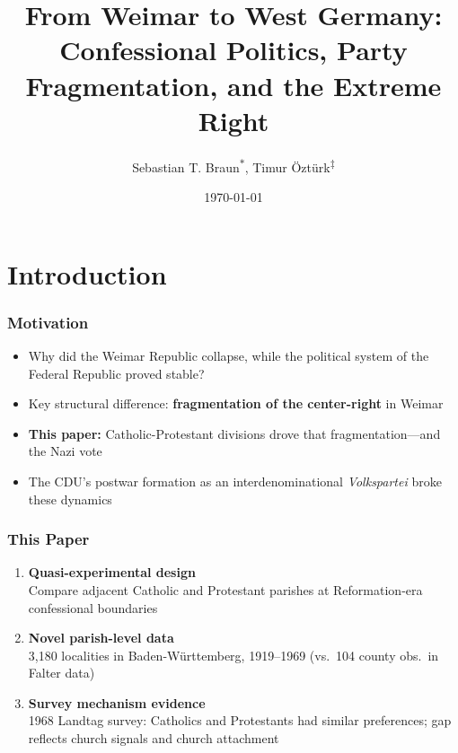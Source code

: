 \documentclass[10pt]{beamer}
\author[Braun and \"{O}zt\"{u}rk]{Sebastian T. Braun\textsuperscript{$\ast$}, Timur \"{O}zt\"{u}rk\textsuperscript{$\ddagger$}}
\institute[]{\textsuperscript{$\ast$}Kiel Institute for the World Economy, Kiel University, IZA \\ \vspace{1mm}
             \textsuperscript{$\ddagger$}University of Bayreuth}
\begin{document}
\title[Confessional Politics]{From Weimar to West Germany:\\Confessional Politics, Party Fragmentation, and the Extreme Right}
\date[2026]{\today}

\begin{frame}
	\titlepage
\end{frame}

\section{Introduction}

\begin{frame}
	\frametitle{Motivation}
	\begin{itemize}
		\item Why did the Weimar Republic collapse, while the political system of the Federal Republic proved stable?
		\item Key structural difference: \textcolor{unigreen}{\textbf{fragmentation of the center-right}} in Weimar
		      \medskip
		\item \textbf{This paper:} Catholic-Protestant divisions drove that fragmentation---and the Nazi vote
		\item The CDU's postwar formation as an interdenominational \textit{Volkspartei} broke these dynamics
	\end{itemize}
\end{frame}

\begin{frame}
	\frametitle{This Paper}
	\begin{enumerate}
		\item \textbf{Quasi-experimental design} \\
		      {\small Compare adjacent Catholic and Protestant parishes at Reformation-era confessional boundaries}
		      \medskip
		\item \textbf{Novel parish-level data} \\
		      {\small 3,180 localities in Baden-Württemberg, 1919--1969 (vs.\ 104 county obs.\ in Falter data)}
		      \medskip
		\item \textbf{Survey mechanism evidence} \\
		      {\small 1968 Landtag survey: Catholics and Protestants had similar preferences; gap reflects church signals and church attachment}
	\end{enumerate}
\end{frame}
\end{document}
